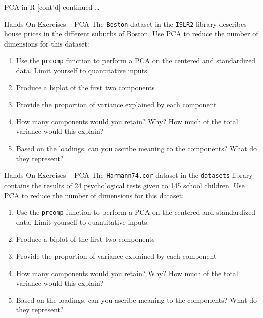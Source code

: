\documentclass[ignorenonframetext,xcolor=x11names]{beamer}
\begin{document}
\begin{frame}[fragile]{PCA in R \small [cont'd]}
continued \ldots
{}
\end{frame}

\begin{frame}{Hands-On Exercises -- PCA}
The \texttt{Boston} dataset in the \texttt{ISLR2} library describes house prices in the different suburbs of Boston. Use PCA to reduce the number of dimensions for this dataset:
\begin{enumerate}
   \item Use the \texttt{prcomp} function to perform a PCA on the centered and standardized data. Limit yourself to quantitative inputs.
   \item Produce a biplot of the first two components
   \item Provide the proportion of variance explained by each component
   \item How many components would you retain? Why? How much of the total variance would this explain?
   \item Based on the loadings, can you ascribe meaning to the components? What do they represent?
\end{enumerate}
\end{frame}

\begin{frame}{Hands-On Exercises -- PCA}
The \texttt{Harmann74.cor} dataset in the \texttt{datasets} library contains the results of 24 psychological tests given to 145 school children. 
Use PCA to reduce the number of dimensions for this dataset:
\begin{enumerate}
   \item Use the \texttt{prcomp} function to perform a PCA on the centered and standardized data. Limit yourself to quantitative inputs.
   \item Produce a biplot of the first two components
   \item Provide the proportion of variance explained by each component
   \item How many components would you retain? Why? How much of the total variance would this explain?
   \item Based on the loadings, can you ascribe meaning to the components? What do they represent?
\end{enumerate}
\end{frame}
\end{document}
